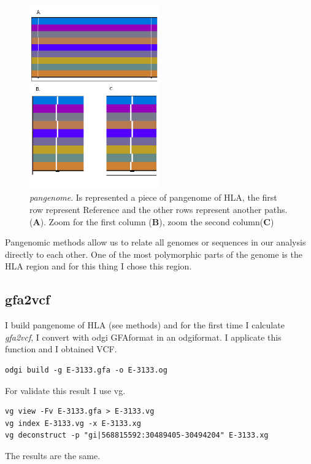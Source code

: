 \begin{figure}[H]
\centering
\includegraphics[width=0.50\textwidth]{fig/pangenome.pdf}
\decoRule
\caption{\textit{pangenome}. Is represented a piece of pangenome of HLA, the first row represent Reference and the other rows represent another paths. (\textbf{A}). Zoom for the first column  (\textbf{B}), zoom the second column(\textbf{C})}
\label{fig:pangenome.pdf}
\end{figure}


Pangenomic methods allow us to relate all genomes or sequences in our analysis directly to each other. One of the most polymorphic parts of the genome is the HLA region and for this thing I chose this region.

\subsection{gfa2vcf}

I build pangenome of HLA (see methods) and for the first time I calculate \textit{gfa2vcf}, I convert with odgi GFAformat in an odgiformat. I applicate this function and I obtained VCF.

\begin{verbatim}
odgi build -g E-3133.gfa -o E-3133.og
\end{verbatim}

For validate this result I use vg.
\begin{verbatim}
vg view -Fv E-3133.gfa > E-3133.vg
vg index E-3133.vg -x E-3133.xg
vg deconstruct -p "gi|568815592:30489405-30494204" E-3133.xg
\end{verbatim}

The results are the same.

